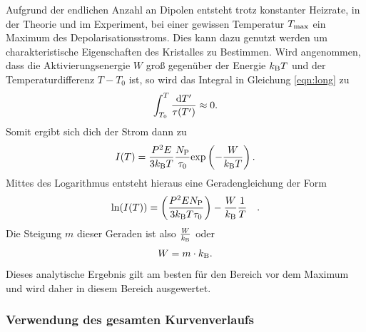 				Aufgrund der endlichen Anzahl an Dipolen entsteht trotz konstanter Heizrate, in der Theorie und im Experiment, bei einer gewissen Temperatur $T_{\text{max}}$ ein Maximum des Depolarisationsstroms.
				Dies kann dazu genutzt werden um charakteristische Eigenschaften des Kristalles zu Bestimmen.
				Wird angenommen, dass die Aktivierungsenergie $W$ groß gegenüber der Energie $k_{\text{B}}T$ und der Temperaturdifferenz $T-T_0$ ist, so wird das Integral in Gleichung \ref{eqn:long} zu
				\begin{equation}
					\int_{T_0}^T\frac{\text{d}T'}{\tau(T')} \approx 0.
				\end{equation}
				Somit ergibt sich dich der Strom dann zu
				\begin{equation}
					I(T) = \frac{P^2E}{3k_{\text{B}}T}\frac{N_{\text{P}}}{\tau_0} \text{exp}\left(-\frac{W}{k_{\text{B}}T}\right).
				\end{equation}	
				Mittes des Logarithmus entsteht hieraus eine Geradengleichung der Form
				\begin{equation}
					\text{ln}(I(T)) = \left(\frac{P^2EN_{\text{P}}}{3k_{\text{B}}T\tau_0}\right) - \frac{W}{k_{\text{B}}} \frac{1}{T} \quad .
				\end{equation}
				Die Steigung $m$ dieser Geraden ist also $\frac{W}{k_{\text{B}}}$ oder
				\begin{equation}
					W = m \cdot k_{\text{B}}.
					\label{eqn:W}
				\end{equation}
				Dieses analytische Ergebnis gilt am besten für den Bereich vor dem Maximum und wird daher in diesem Bereich ausgewertet.			

		\subsubsection{Verwendung des gesamten Kurvenverlaufs}

